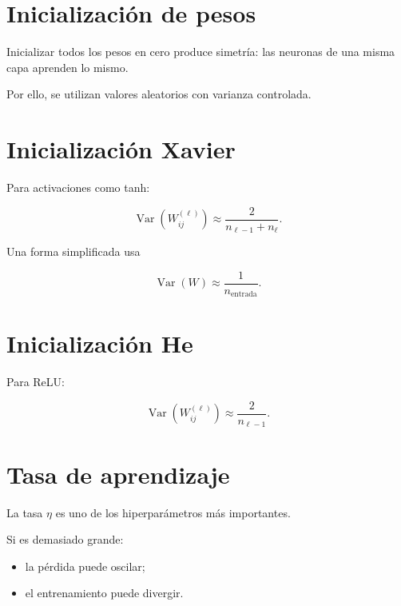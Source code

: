 \documentclass[
  spanish,
  10.5pt,
  letterpaper,
  DIV=11,
  numbers=noendperiod,
  oneside,
  open=any]{scrreprt}
\providecommand{\tightlist}{%
  \setlength{\itemsep}{0pt}\setlength{\parskip}{0pt}}
\theoremstyle{definition}
\theoremstyle{definition}
\theoremstyle{plain}
\theoremstyle{remark}
\begin{document}
\section*{Inicialización de pesos}\label{inicializaciuxf3n-de-pesos}


Inicializar todos los pesos en cero produce simetría: las neuronas de
una misma capa aprenden lo mismo.

Por ello, se utilizan valores aleatorios con varianza controlada.

\section*{Inicialización Xavier}\label{inicializaciuxf3n-xavier}


Para activaciones como tanh:

\[
\operatorname{Var}
\left(
W_{ij}^{(\ell)}
\right)
\approx
\frac{2}
{n_{\ell-1}+n_\ell}.
\]

Una forma simplificada usa

\[
\operatorname{Var}(W)
\approx
\frac{1}{n_{\text{entrada}}}.
\]

\section*{Inicialización He}\label{inicializaciuxf3n-he}


Para ReLU:

\[
\operatorname{Var}
\left(
W_{ij}^{(\ell)}
\right)
\approx
\frac{2}{n_{\ell-1}}.
\]

\section*{Tasa de aprendizaje}\label{tasa-de-aprendizaje}


La tasa \(\eta\) es uno de los hiperparámetros más importantes.

Si es demasiado grande:

\begin{itemize}
\tightlist
\item
  la pérdida puede oscilar;
\item
  el entrenamiento puede divergir.
\end{itemize}
\end{document}
